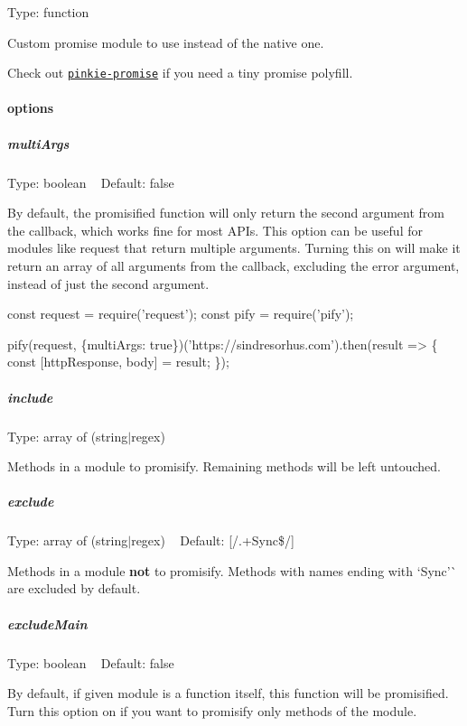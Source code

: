 Type\+: {\ttfamily function}

Custom promise module to use instead of the native one.

Check out \href{https://github.com/floatdrop/pinkie-promise}{\tt {\ttfamily pinkie-\/promise}} if you need a tiny promise polyfill.

\paragraph*{options}

\subparagraph*{multi\+Args}

Type\+: {\ttfamily boolean} ~\newline
Default\+: {\ttfamily false}

By default, the promisified function will only return the second argument from the callback, which works fine for most A\+P\+Is. This option can be useful for modules like {\ttfamily request} that return multiple arguments. Turning this on will make it return an array of all arguments from the callback, excluding the error argument, instead of just the second argument.


\begin{DoxyCode}
const request = require('request');
const pify = require('pify');

pify(request, \{multiArgs: true\})('https://sindresorhus.com').then(result => \{
  const [httpResponse, body] = result;
\});
\end{DoxyCode}


\subparagraph*{include}

Type\+: {\ttfamily array} of ({\ttfamily string}$\vert${\ttfamily regex})

Methods in a module to promisify. Remaining methods will be left untouched.

\subparagraph*{exclude}

Type\+: {\ttfamily array} of ({\ttfamily string}$\vert${\ttfamily regex}) ~\newline
Default\+: {\ttfamily \mbox{[}/.+\+Sync\$/\mbox{]}}

Methods in a module {\bfseries not} to promisify. Methods with names ending with `\textquotesingle{}Sync'\`{} are excluded by default.

\subparagraph*{exclude\+Main}

Type\+: {\ttfamily boolean} ~\newline
Default\+: {\ttfamily false}

By default, if given module is a function itself, this function will be promisified. Turn this option on if you want to promisify only methods of the module.


